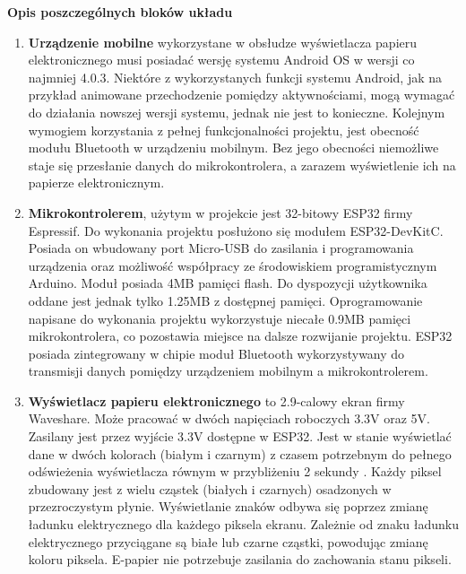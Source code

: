 \documentclass[a4paper,12pt, twoside]{article}
\begin{document}
        \begin{flushleft}
        \textbf{Opis poszczególnych bloków układu}
        \end{flushleft}
        \begin{enumerate}
            \item \textbf{Urządzenie mobilne} wykorzystane w obsłudze wyświetlacza papieru elektronicznego musi posiadać wersję systemu Android OS w wersji co najmniej 4.0.3. Niektóre z wykorzystanych funkcji systemu Android, jak na przykład animowane przechodzenie pomiędzy aktywnościami, mogą wymagać do działania nowszej wersji systemu, jednak nie jest to konieczne.
            Kolejnym wymogiem korzystania z pełnej funkcjonalności projektu, jest obecność modułu Bluetooth w urządzeniu mobilnym. Bez jego obecności niemożliwe staje się przesłanie danych do mikrokontrolera, a zarazem wyświetlenie ich na papierze elektronicznym.
        
    	    \item \textbf{Mikrokontrolerem}, użytym w projekcie jest 32-bitowy ESP32 firmy Espressif. Do wykonania projektu posłużono się modułem ESP32-DevKitC. Posiada on wbudowany port Micro-USB do zasilania i programowania urządzenia oraz możliwość współpracy ze środowiskiem programistycznym Arduino. Moduł posiada 4MB pamięci flash\cite{flash}. Do dyspozycji użytkownika oddane jest jednak tylko 1.25MB z dostępnej pamięci. Oprogramowanie napisane do wykonania projektu wykorzystuje niecałe 0.9MB pamięci mikrokontrolera, co pozostawia miejsce na dalsze rozwijanie projektu. ESP32 posiada zintegrowany w chipie moduł Bluetooth wykorzystywany do transmisji danych pomiędzy urządzeniem mobilnym a mikrokontrolerem.
    
    
            \item \textbf{Wyświetlacz papieru elektronicznego} to 2.9-calowy ekran firmy Waveshare. Może pracować w dwóch napięciach roboczych 3.3V oraz 5V. Zasilany jest przez wyjście 3.3V dostępne w ESP32. Jest w stanie wyświetlać dane w dwóch kolorach (białym i czarnym) z czasem potrzebnym do pełnego odświeżenia wyświetlacza równym w przybliżeniu 2 sekundy \cite{waveshare}. Każdy piksel zbudowany jest z wielu cząstek (białych i czarnych) osadzonych w przezroczystym płynie. Wyświetlanie znaków odbywa się poprzez zmianę ładunku elektrycznego dla każdego piksela ekranu. Zależnie od znaku ładunku elektrycznego przyciągane są białe lub czarne cząstki, powodując zmianę koloru piksela. E-papier nie potrzebuje zasilania do zachowania stanu pikseli.\newpage
            

\end{enumerate}
\end{document}
